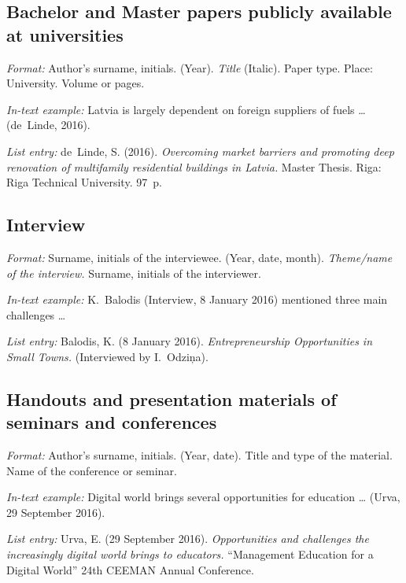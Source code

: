 \subsection*{Bachelor and Master papers publicly available at universities}

\emph{Format:} Author's surname, initials. (Year). \emph{Title} (Italic). Paper type. Place: University. Volume or pages.

\emph{In-text example:} Latvia is largely dependent on foreign suppliers of fuels \dots{} (de~Linde, 2016).

\emph{List entry:} de~Linde, S. (2016). \emph{Overcoming market barriers and promoting deep renovation of multifamily residential buildings in Latvia.} Master Thesis. Riga: Riga Technical University. 97~p.

\subsection*{Interview}

\emph{Format:} Surname, initials of the interviewee. (Year, date, month). \emph{Theme/name of the interview.} Surname, initials of the interviewer.

\emph{In-text example:} K.~Balodis (Interview, 8 January 2016) mentioned three main challenges \dots{}

\emph{List entry:} Balodis, K. (8 January 2016). \emph{Entrepreneurship Opportunities in Small Towns.} (Interviewed by I.~Odziņa).

\subsection*{Handouts and presentation materials of seminars and conferences}

\emph{Format:} Author's surname, initials. (Year, date). Title and type of the material. Name of the conference or seminar.

\emph{In-text example:} Digital world brings several opportunities for education \dots{} (Urva, 29 September 2016).

\emph{List entry:} Urva, E. (29 September 2016). \emph{Opportunities and challenges the increasingly digital world brings to educators.} ``Management Education for a Digital World'' 24th CEEMAN Annual Conference.
